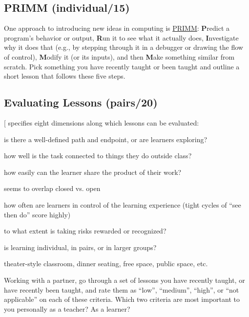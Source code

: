 \subsection{PRIMM (individual/15)}\label{primm-individual15}

One approach to introducing new ideas in computing is \href{http://blogs.kcl.ac.uk/cser/2017/09/01/primm-a-structured-approach-to-teaching-programming/}{PRIMM}:
\textbf{P}redict a program's behavior or output, \textbf{R}un it to see what it
actually does, \textbf{I}nvestigate why it does that (e.g., by stepping
through it in a debugger or drawing the flow of control), \textbf{M}odify
it (or its inputs), and then \textbf{M}ake something similar from scratch.
Pick something you have recently taught or been taught and outline a
short lesson that follows these five steps.

\subsection{Evaluating Lessons (pairs/20)}\label{evaluating-lessons-pairs20}

{[}\protect[\hyperlink{b:Mart2017}{Mart2017}]{]} specifies eight dimensions along which lessons can be
evaluated:

\begin{description}
\tightlist
\item[Closed vs. open:]
is there a well-defined path and endpoint, or are learners
exploring?
\item[Cultural relevance:]
how well is the task connected to things they do outside class?
\item[Recognition:]
how easily can the learner share the product of their work?
\item[Space to play:]
seems to overlap closed vs. open
\item[Driver shift:]
how often are learners in control of the learning experience (tight
cycles of ``see then do'' score highly)
\item[Risk reward:]
to what extent is taking risks rewarded or recognized?
\item[Grouping:]
is learning individual, in pairs, or in larger groups?
\item[Session shape:]
theater-style classroom, dinner seating, free space, public space,
etc.
\end{description}

Working with a partner, go through a set of lessons you have recently
taught, or have recently been taught, and rate them as ``low'', ``medium'',
``high'', or ``not applicable'' on each of these criteria. Which two
criteria are most important to you personally as a teacher? As a
learner?

